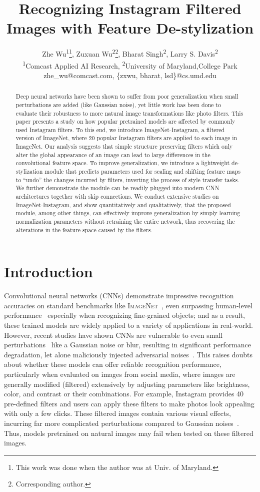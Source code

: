 \documentclass[letterpaper]{article} %
\title{Recognizing Instagram Filtered Images with Feature De-stylization}
\author{Zhe Wu\textsuperscript{\rm 1}\thanks{This work was done when the author was at Univ. of Maryland.},
Zuxuan Wu\textsuperscript{\rm 2}\thanks{Corresponding author.},
Bharat Singh\textsuperscript{\rm 2},
Larry S. Davis\textsuperscript{\rm 2}\\ 
\textsuperscript{\rm 1}Comcast Applied AI Research, \textsuperscript{\rm 2}University of Maryland,College Park\\ %
zhe\_wu@comcast.com, \{zxwu, bharat, lsd\}@cs.umd.edu%
}
\newcommand{\imagenet}{{\scshape ImageNet}\xspace}
\begin{document}
\maketitle

\begin{abstract}
Deep neural networks have been shown to suffer from poor generalization when small perturbations are added (like Gaussian noise), yet little work has been done to evaluate their robustness to more natural image transformations like photo filters. This paper presents a study on how popular pretrained models are affected by commonly used Instagram filters. To this end, we introduce ImageNet-Instagram, a filtered version of ImageNet, where 20 popular Instagram filters are applied to each image in ImageNet. Our analysis suggests that simple structure preserving filters which only alter the global appearance of an image can lead to large differences in the convolutional feature space. To improve generalization, we introduce a lightweight de-stylization module that predicts parameters used for scaling and shifting feature maps to ``undo'' the changes incurred by filters, inverting the process of style transfer tasks. We further demonstrate the module can be readily plugged into modern CNN architectures together with skip connections. We conduct extensive studies on ImageNet-Instagram, and show quantitatively and qualitatively, that the proposed module, among other things, can effectively improve generalization by simply learning normalization parameters without retraining the entire network, thus recovering the alterations in the feature space caused by the filters. 
\end{abstract}

\section{Introduction}
Convolutional neural networks (CNNs) demonstrate impressive recognition accuracies on standard benchmarks like \imagenet~\cite{deng2009imagenet}, even surpassing human-level performance~\cite{he2015delving} especially when recognizing fine-grained objects; and as a result, these trained models are widely applied to a variety of applications in real-world. However, recent studies have shown CNNs are vulnerable to even small perturbations~\cite{hendrycks2018benchmarking} like a Gaussian noise or blur, resulting in significant performance degradation, let alone maliciously injected adversarial noises~\cite{goodfellow2014generative,kurakin2016adversarial}. This raises doubts about whether these models can offer reliable recognition performance, particularly when evaluated on images from social media, where images are generally modified (filtered) extensively by adjusting parameters like brightness, color, and contrast or their combinations. For example, Instagram provides 40 pre-defined filters and users can apply these filters to make photos look appealing with only a few clicks. These filtered images contain various visual effects, incurring far more complicated perturbations compared to Gaussian noises~\cite{hendrycks2018benchmarking,geirhos2018generalisation}. Thus, models pretrained on natural images may fail when tested on these filtered images.
\end{document}
